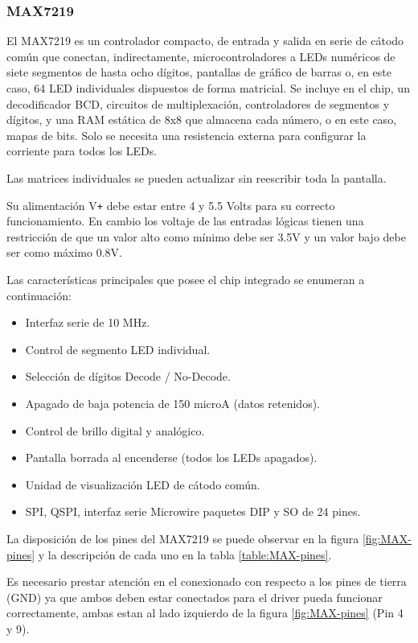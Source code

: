 \subsubsection{MAX7219}\label{sec:max7219}
El MAX7219 es un controlador compacto, de entrada y salida en serie de cátodo común que conectan, indirectamente, microcontroladores a LEDs numéricos de siete segmentos de hasta ocho dígitos, pantallas de gráfico de barras o, en este caso, 64 LED individuales dispuestos de forma matricial. Se incluye en el chip, un decodificador BCD, circuitos de multiplexación, controladores de segmentos y dígitos, y una RAM estática de 8x8 que almacena cada número, o en este caso, mapas de bits. Solo se necesita una resistencia externa para configurar la corriente para todos los LEDs.

Las matrices individuales se pueden actualizar sin reescribir toda la pantalla.

Su alimentación V\texttt{+} debe estar entre 4 y 5.5 Volts para su correcto funcionamiento. En cambio los voltaje de las entradas lógicas tienen una restricción de que un valor alto como mínimo debe ser 3.5V y un valor bajo debe ser como máximo 0.8V.

Las características principales que posee el chip integrado se enumeran a continuación:
\begin{itemize}
	\item Interfaz serie de 10 MHz.
	\item Control de segmento LED individual.
	\item Selección de dígitos Decode / No-Decode.
	\item Apagado de baja potencia de 150 microA (datos retenidos).
	\item Control de brillo digital y analógico.
	\item Pantalla borrada al encenderse (todos los LEDs apagados).
	\item Unidad de visualización LED de cátodo común.
	\item SPI, QSPI, interfaz serie Microwire paquetes DIP y SO de 24 pines.
\end{itemize}

La disposición de los pines del MAX7219 se puede observar en la figura \ref{fig:MAX-pines} y la descripción de cada uno en la tabla \ref{table:MAX-pines}.

Es necesario prestar atención en el conexionado con respecto a los pines de tierra (GND) ya que ambos deben estar conectados para el driver pueda funcionar correctamente, ambas estan al lado izquierdo de la figura \ref{fig:MAX-pines} (Pin 4 y 9).

